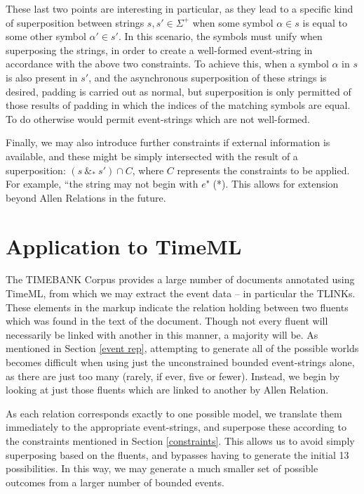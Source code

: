 \documentclass[a4paper,11pt,leqno]{article}
\newcommand{\vph}[1]{\vphantom{#1}}
\newcommand{\ebox}[1]{\fbox{$\vph{',}#1$}}
\begin{document}
These last two points are interesting in particular, as they lead to a specific 
kind of superposition between strings $s, s' \in \Sigma^+$ when some 
symbol $\alpha \in s$ is equal to some other symbol $\alpha' \in s'$. In this 
scenario, the symbols must unify when superposing the strings, in order to 
create a well-formed event-string in accordance with the above two constraints. 
To achieve this, when a symbol $\alpha$ in $s$ is also present in $s'$, and the 
asynchronous superposition of these strings is desired, padding is carried out 
as normal, but superposition is only permitted of those results of padding 
in which the indices of the matching symbols are equal. To do otherwise would 
permit event-strings which are not well-formed.%

Finally, we may also introduce further constraints if external 
information is 
available, and these might be simply intersected with the result of a 
superposition: $(s\ \&_* \ s') \cap C$, where $C$ represents the constraints to 
be applied. For example, ``the string may not begin with $e$" (\ebox{}\ebox{A 	
- e}\ebox{A}*\ebox{}). This allows for extension beyond Allen Relations in the 
future.

\section{Application to TimeML}\label{application}
The TIMEBANK Corpus \citep{pustejovsky2003timebank} provides a large number of 
documents annotated using TimeML, from which we may extract the event data -- 
in particular the TLINKs. These elements in the markup indicate the relation 
holding between two fluents which was found in the text of the document. Though 
not every fluent will necessarily be linked with another in this manner, a 
majority will be.  As mentioned in Section \ref{event rep}, attempting to 
generate all of the possible worlds becomes difficult when using just the 
unconstrained bounded event-strings alone, as there are just too many (rarely, 
if ever, five or fewer). Instead, we begin by looking at just those fluents 
which are linked to another by Allen Relation.

As each relation corresponds exactly to one possible model, we translate them 
immediately to the appropriate event-strings, and superpose these according to 
the constraints mentioned in Section \ref{constraints}. This allows us to avoid 
simply superposing based on the fluents, and bypasses having to generate the 
initial 13 possibilities. In this way, we may generate a much smaller set of 
possible outcomes from a larger number of bounded events.
\end{document}
